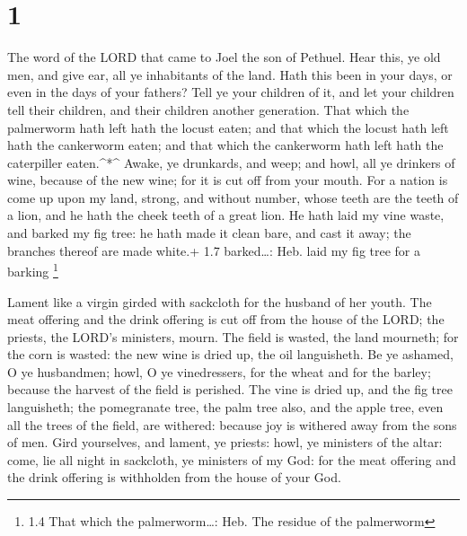 \hypertarget{section}{%
\section{1}\label{section}}

 The word of the LORD that came to Joel the son of Pethuel.
 Hear this, ye old men, and give ear, all ye inhabitants of
the land. Hath this been in your days, or even in the days of your
fathers?  Tell ye your children of it, and let your children
tell their children, and their children another generation. 
That which the palmerworm hath left hath the locust eaten; and that
which the locust hath left hath the cankerworm eaten; and that which the
cankerworm hath left hath the caterpiller eaten.\^{}*\^{} 
Awake, ye drunkards, and weep; and howl, all ye drinkers of wine,
because of the new wine; for it is cut off from your mouth. 
For a nation is come up upon my land, strong, and without number, whose
teeth are the teeth of a lion, and he hath the cheek teeth of a great
lion.  He hath laid my vine waste, and barked my fig tree:
he hath made it clean bare, and cast it away; the branches thereof are
made white.+ 1.7 barked\ldots: Heb. laid my fig tree for a barking
\footnote{1.4 That which the palmerworm\ldots: Heb. The residue of the
  palmerworm}

 Lament like a virgin girded with sackcloth for the husband
of her youth.  The meat offering and the drink offering is
cut off from the house of the LORD; the priests, the LORD's ministers,
mourn.  The field is wasted, the land mourneth; for the
corn is wasted: the new wine is dried up, the oil languisheth.
 Be ye ashamed, O ye husbandmen; howl, O ye vinedressers,
for the wheat and for the barley; because the harvest of the field is
perished.  The vine is dried up, and the fig tree
languisheth; the pomegranate tree, the palm tree also, and the apple
tree, even all the trees of the field, are withered: because joy is
withered away from the sons of men.  Gird yourselves, and
lament, ye priests: howl, ye ministers of the altar: come, lie all night
in sackcloth, ye ministers of my God: for the meat offering and the
drink offering is withholden from the house of your God.

